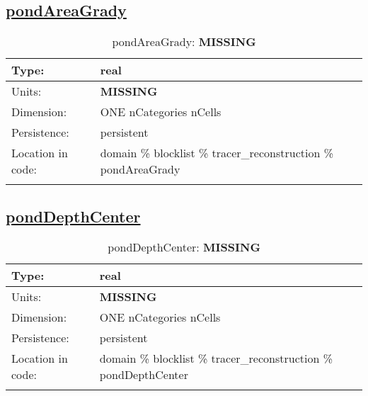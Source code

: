 \subsection[pondAreaGrady]{\hyperref[sec:var_tab_tracer_reconstruction]{pondAreaGrady}}
\label{subsec:var_sec_tracer_reconstruction_pondAreaGrady}
\begin{center}
\begin{longtable}{| p{2.0in} | p{4.0in} |}
        \hline 
        Type: & real \\
        \hline 
        Units: & {\bf \color{red} MISSING} \\
        \hline 
        Dimension: & ONE nCategories nCells \\
        \hline 
        Persistence: & persistent \\
        \hline 
         Location in code: & domain \% blocklist \% tracer\_reconstruction \% pondAreaGrady \\
         \hline 
    \caption{pondAreaGrady: {\bf \color{red} MISSING}}
\end{longtable}
\end{center}
\subsection[pondDepthCenter]{\hyperref[sec:var_tab_tracer_reconstruction]{pondDepthCenter}}
\label{subsec:var_sec_tracer_reconstruction_pondDepthCenter}
\begin{center}
\begin{longtable}{| p{2.0in} | p{4.0in} |}
        \hline 
        Type: & real \\
        \hline 
        Units: & {\bf \color{red} MISSING} \\
        \hline 
        Dimension: & ONE nCategories nCells \\
        \hline 
        Persistence: & persistent \\
        \hline 
         Location in code: & domain \% blocklist \% tracer\_reconstruction \% pondDepthCenter \\
         \hline 
    \caption{pondDepthCenter: {\bf \color{red} MISSING}}
\end{longtable}
\end{center}
